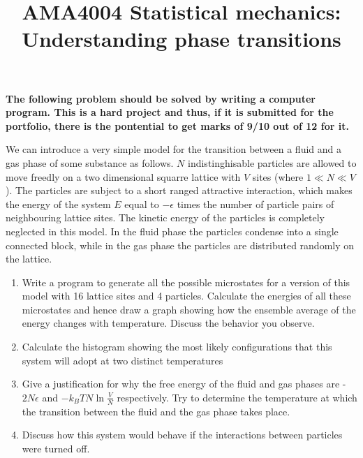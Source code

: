 \documentclass[a4paper]{article}
\title{
\vspace{-3em}
\begin{tcolorbox}
\Huge\sffamily AMA4004 Statistical mechanics: Understanding phase transitions
\end{tcolorbox}
\vspace{-3em}
}
\date{}
\begin{document}
\maketitle

{\bf The following problem should be solved by writing a computer program.  This is a hard project and thus, if it is submitted for the portfolio, there is the pontential to get marks of 9/10 out of 12 for it.}

\vspace{1cm}

We can introduce a very simple model for the transition between a fluid and a gas phase of some substance as follows.  $N$ indistinghisable particles are
allowed to move freedly on a two dimensional squarre lattice with $V$ sites (where $1 \ll N \ll V$).  The particles are subject to a short ranged attractive
interaction, which makes the energy of the system $E$ equal to $-\epsilon$ times the number of particle pairs of neighbouring lattice sites.  The kinetic energy
of the particles is completely neglected in this model. In the fluid phase the particles condense into a single connected block, while in the gas phase the particles
are distributed randomly on the lattice.

\begin{enumerate}
\item Write a program to generate all the possible microstates for a version of this model with 16 lattice sites and 4 particles. Calculate the energies of all these microstates and hence draw a graph showing how the ensemble average of the energy changes with temperature. Discuss the behavior you observe. 
\item Calculate the histogram showing the most likely configurations that this system will adopt at two distinct temperatures 
\item Give a justification for why the free energy of the fluid and gas phases are -$2N\epsilon$ and $-k_B TN \ln \frac{V}{N}$ respectively.  Try to determine the temperature at which the transition between the fluid and the gas phase takes place. 
\item Discuss how this system would behave if the interactions between particles were turned off.  
\end{enumerate}
\end{document}
